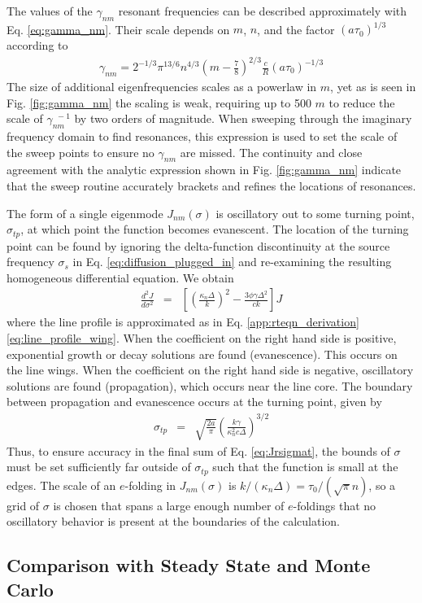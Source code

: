 \documentclass{aastex63}
\newcommand{\be}{\begin{eqnarray}}
\newcommand{\ee}{\end{eqnarray}}
\begin{document}
The values of the $\gamma_{nm}$ resonant frequencies can be described approximately with Eq. \ref{eq:gamma_nm}. Their scale depends on $m$, $n$, and the factor $(a\tau_0)^{1/3}$ according to 
\be \label{eq:gamma_nm}
\gamma_{nm} = 2^{-1/3} \pi^{13/6} n^{4/3}\left(m-\frac{7}{8}\right)^{2/3}\frac{c}{R}(a\tau_0)^{-1/3} 
\ee
The size of additional eigenfrequencies scales as a powerlaw in $m$, yet as is seen in Fig. \ref{fig:gamma_nm} the scaling is weak, requiring up to 500 $m$ to reduce the scale of $\gamma_{nm}^{\ \ -1}$ by two orders of magnitude. When sweeping through the imaginary frequency domain to find resonances, this expression is used to set the scale of the sweep points to ensure no $\gamma_{nm}$ are missed. The continuity and close agreement with the analytic expression shown in Fig. \ref{fig:gamma_nm} indicate that the sweep routine accurately brackets and refines the locations of resonances.

The form of a single eigenmode $J_{nm}(\sigma)$ is oscillatory out to some turning point, $\sigma_{tp}$, at which point the function becomes evanescent. The location of the turning point can be found by ignoring the delta-function discontinuity at the source frequency $\sigma_s$ in Eq. \ref{eq:diffusion_plugged_in} and re-examining the resulting homogeneous differential equation. We obtain
\be
\frac{d^2J}{d\sigma^2} & = & \left[ \left( \frac{\kappa_n \Delta }{k} \right)^2 - \frac{3\phi \gamma\Delta^2}{ck}\right] J
\ee
where the line profile is approximated as in Eq. \ref{app:rteqn_derivation}\ref{eq:line_profile_wing}. When the coefficient on the right hand side is positive, exponential growth or decay solutions are found (evanescence). This occurs on the line wings. When the coefficient on the right hand side is negative, oscillatory solutions are found (propagation), which occurs near the line core. The boundary between propagation and evanescence occurs at the turning point, given by
\be
\sigma_{tp} & = & \sqrt{\frac{2a}{\pi}}\left( \frac{k \gamma}{ \kappa_n^2 c \Delta} \right)^{3/2}
\ee
Thus, to ensure accuracy in the final sum of Eq. \ref{eq:Jrsigmat}, the bounds of $\sigma$ must be set sufficiently far outside of $\sigma_{tp}$ such that the function is small at the edges. The scale of an $e$-folding in $J_{nm}(\sigma)$ is $k/(\kappa_n \Delta) = \tau_0 / (\sqrt{\pi} n)$, so a grid of $\sigma$ is chosen that spans a large enough number of $e$-foldings that no oscillatory behavior is present at the boundaries of the calculation.

\subsection{Comparison with Steady State and Monte Carlo}
\end{document}
